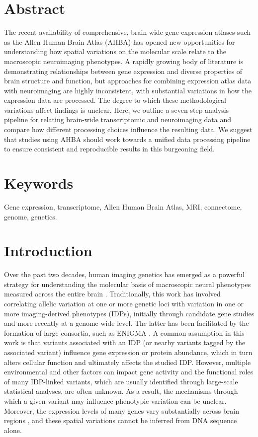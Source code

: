 \documentclass[10pt,A4]{article}
\begin{document}
\section*{Abstract}
The recent availability of comprehensive, brain-wide gene expression atlases such as the Allen Human Brain Atlas (AHBA) has opened new opportunities for understanding how spatial variations on the molecular scale relate to the macroscopic neuroimaging phenotypes. A rapidly growing body of literature is demonstrating relationships between gene expression and diverse properties of brain structure and function, but approaches for combining expression atlas data with neuroimaging are highly inconsistent, with substantial variations in how the expression data are processed. The degree to which these methodological variations affect findings is unclear. Here, we outline a seven-step analysis pipeline for relating brain-wide transcriptomic and neuroimaging data and compare how different processing choices influence the resulting data. We suggest that studies using AHBA should work towards a unified data processing pipeline to ensure consistent and reproducible results in this burgeoning field.

\section*{Keywords}

Gene expression, transcriptome, Allen Human Brain Atlas, MRI, connectome, genome, genetics.


\section*{Introduction}
Over the past two decades, human imaging genetics has emerged as a powerful strategy for understanding the molecular basis of macroscopic neural phenotypes measured across the entire brain \citep{Meyer-Lindenberg2006a,Munoz2009,Arslan2015,Hashimoto2015}. Traditionally, this work has involved correlating allelic variation at one or more genetic loci with variation in one or more imaging-derived phenotypes (IDPs), initially through candidate gene studies and more recently at a genome-wide level. The latter has been facilitated by the formation of large consortia, such as ENIGMA \citep{Thompson2014}. A common assumption in this work is that variants associated with an IDP (or nearby variants tagged by the associated variant) influence gene expression or protein abundance, which in turn alters cellular function and ultimately affects the studied IDP. However, multiple environmental and other factors can impact gene activity \citep{Fraser2005,Choi2007,Cole2009} and the functional roles of many IDP-linked variants, which are usually identified through large-scale statistical analyses, are often unknown. As a result, the mechanisms through which a given variant may influence phenotypic variation can be unclear. Moreover, the expression levels of many genes vary substantially across brain regions \citep{Hawrylycz2015}, and these spatial variations cannot be inferred from DNA sequence alone.
\end{document}
